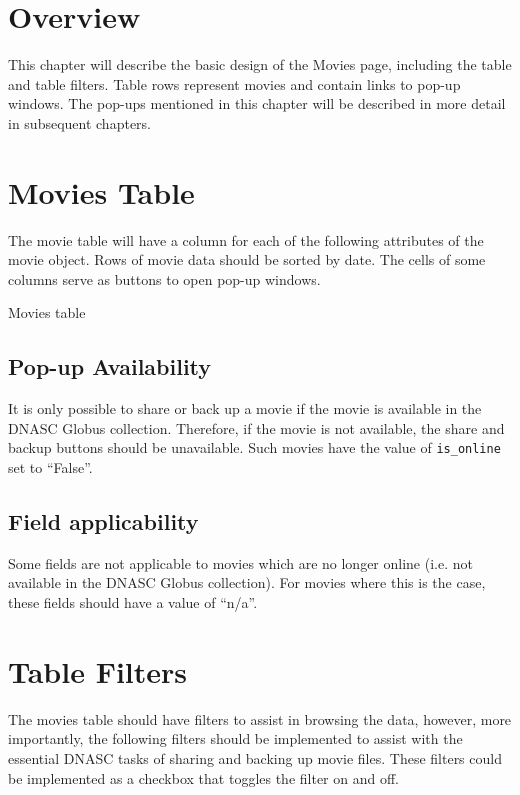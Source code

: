 
\section{Overview}

This chapter will describe the basic design of the Movies page, including the table and
table filters. Table rows represent movies and contain links to pop-up windows. The pop-ups 
mentioned in this chapter will be described in more detail in subsequent chapters.

\section{Movies Table}
The movie table will have a column for each of the following attributes of the movie object. 
Rows of movie data should be sorted by date. The cells of some columns serve as buttons to 
open pop-up windows.

\begin{table}[h]
    
    \caption{Movies table}
\end{table}

\subsection{Pop-up Availability}

It is only possible to share or back up a movie if the movie is available in the DNASC Globus
collection. Therefore, if the movie is not available, the share and backup buttons should be
unavailable. Such movies have the value of \texttt{is\_online} set to ``False''.

\subsection{Field applicability}

Some fields are not applicable to movies which are no longer online (i.e. not available in the
DNASC Globus collection). For movies where this is the case, these fields should have a value
of ``n/a''.

\section{Table Filters}

The movies table should have filters to assist in browsing the data, however, more importantly,
the following filters should be implemented to assist with the essential DNASC tasks of sharing
and backing up movie files. These filters could be implemented as a checkbox that toggles the filter 
on and off.

